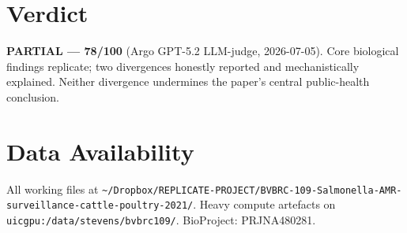 \documentclass[11pt]{article}
\begin{document}
\section{Verdict}
\textbf{PARTIAL --- 78/100} (Argo GPT-5.2 LLM-judge, 2026-07-05). Core biological findings replicate; two divergences honestly reported and mechanistically explained. Neither divergence undermines the paper's central public-health conclusion.

\section{Data Availability}
All working files at \texttt{\textasciitilde/Dropbox/REPLICATE-PROJECT/BVBRC-109-Salmonella-AMR-surveillance-cattle-poultry-2021/}. Heavy compute artefacts on \texttt{uicgpu:/data/stevens/bvbrc109/}. BioProject: PRJNA480281.
\end{document}
